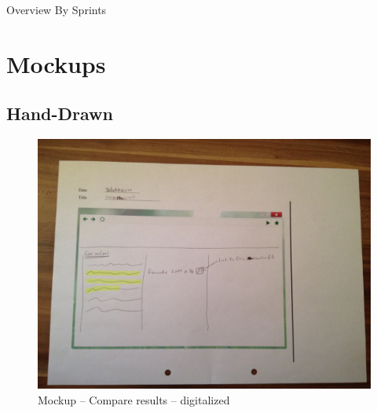 \begin{appendix}
\begin{landscape}

\DTLsetseparator{,}

  \centering

\begin{table}[htbp]
  \caption{Overview By Sprints}
  \centering
\end{table}

\end{landscape}

\chapter{Mockups}\label{appendix:mockups}

\section{Hand-Drawn}

\begin{figure}[!h]
  \centering
    \includegraphics[width=\textwidth]{mockups/m_compare_result.jpg}
  \caption{Mockup – Compare results – digitalized }
  \label{fig:mCompareResultsMockup}
\end{figure}


\end{appendix}
